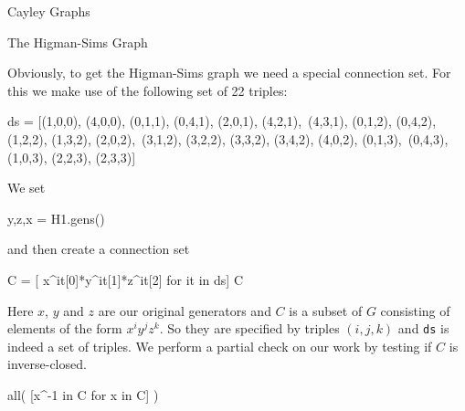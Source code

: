 \begin{chap}{Cayley Graphs}
\begin{sect}{The Higman-Sims Graph}
%
\begin{para}
Obviously, to get the Higman-Sims graph we need a special connection set.
For this we make use of the following set of 22 triples:
\end{para}
%
\begin{sagecode}
\begin{sageinput}
ds = [(1,0,0), (4,0,0), (0,1,1), (0,4,1), (2,0,1), (4,2,1),\
  (4,3,1), (0,1,2), (0,4,2), (1,2,2), (1,3,2), (2,0,2),\
  (3,1,2), (3,2,2), (3,3,2), (3,4,2), (4,0,2), (0,1,3),\
  (0,4,3), (1,0,3), (2,2,3), (2,3,3)]
\end{sageinput}
\end{sagecode}
%
\begin{para}
We set
\end{para}
%
\begin{sagecode}
\begin{sageinput}
y,z,x = H1.gens()
\end{sageinput}
\end{sagecode}
%
\begin{para}
and then create a connection set
\end{para}
%
\begin{sagecode}
\begin{sageinput}
C = [ x^it[0]*y^it[1]*z^it[2] for it in ds]
C
\end{sageinput}
\begin{sageoutput}
[(1,2,3,4,5), (1,5,4,3,2), (2,3,5,4)(6,7,8,9,10), 
(2,3,5,4)(6,10,9,8,7), (1,5,3,4), (1,4,5,2)(6,8,10,7,9), 
(1,4,5,2)(6,9,7,10,8), (2,5)(3,4)(6,7,8,9,10), 
(2,5)(3,4)(6,10,9,8,7), (1,5)(2,4)(6,8,10,7,9), 
(1,5)(2,4)(6,9,7,10,8), (1,4)(2,3), (1,3)(4,5)(6,7,8,9,10), 
(1,3)(4,5)(6,8,10,7,9), (1,3)(4,5)(6,9,7,10,8), 
(1,3)(4,5)(6,10,9,8,7), (1,2)(3,5), (2,4,5,3)(6,7,8,9,10), 
(2,4,5,3)(6,10,9,8,7), (1,4,3,5), (1,2,5,4)(6,8,10,7,9), 
(1,2,5,4)(6,9,7,10,8)]
\end{sageoutput}
\end{sagecode}
%
\begin{para}
Here $x$, $y$ and $z$ are our original generators and $C$ is a subset
of $G$ consisting of elements of the form $x^iy^jz^k$. So they are
specified by triples $(i,j,k)$ and \verb|ds| is indeed a set of triples.
We perform a partial check on our work by testing if $C$ is inverse-closed.
\end{para}
%
\begin{sagecode}
\begin{sageinput}
all( [x^-1 in C for x in C] )
\end{sageinput}

\end{sagecode}
\end{sect}
\end{chap}
